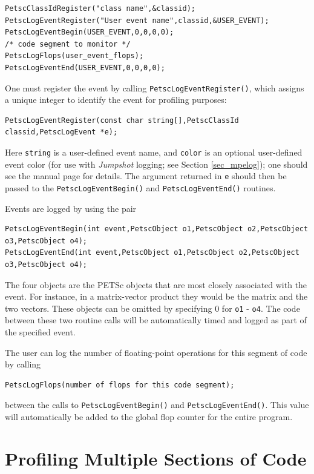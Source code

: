 {{\begin{lstlisting}
PetscClassIdRegister("class name",&classid);
PetscLogEventRegister("User event name",classid,&USER_EVENT);
PetscLogEventBegin(USER_EVENT,0,0,0,0);
/* code segment to monitor */
PetscLogFlops(user_event_flops);
PetscLogEventEnd(USER_EVENT,0,0,0,0);
\end{lstlisting}

One must register the event by calling \lstinline{PetscLogEventRegister()}, which assigns a unique integer to identify the
event for profiling purposes:
\begin{lstlisting}
PetscLogEventRegister(const char string[],PetscClassId classid,PetscLogEvent *e);
\end{lstlisting}
Here \lstinline{string} is a user-defined event name, and \lstinline{color} is an
optional user-defined event color (for use with {\em Jumpshot} logging; see Section \ref{sec_mpelog});
one should see the manual page for details.  The argument returned in \lstinline{e} should then
be passed to the \lstinline{PetscLogEventBegin()} and \lstinline{PetscLogEventEnd()}
routines.

Events are logged by using the pair
\begin{lstlisting}
PetscLogEventBegin(int event,PetscObject o1,PetscObject o2,PetscObject o3,PetscObject o4);
PetscLogEventEnd(int event,PetscObject o1,PetscObject o2,PetscObject o3,PetscObject o4);
\end{lstlisting}
The four objects are the PETSc objects that are most closely associated
with the event.  For instance, in a matrix-vector product they
would be the matrix and the two vectors.  These objects can be omitted
by specifying 0 for \lstinline{o1} - \lstinline{o4}.  The code between these
two routine calls will be automatically timed and logged as part of the
specified event.

The user can log the number of floating-point operations
for this segment of code by calling
\begin{lstlisting}
PetscLogFlops(number of flops for this code segment);
\end{lstlisting}
between the calls to \lstinline{PetscLogEventBegin()} and \lstinline{PetscLogEventEnd()}.
This value will automatically be added to the global flop counter for the
entire program.

\section{Profiling Multiple Sections of Code}
\label{sec_profstages}

}}
